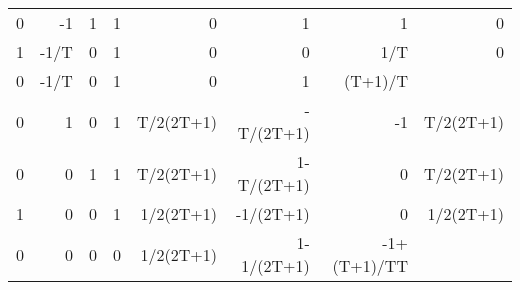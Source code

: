 \begin{table}[ht]
\begin{tabular}{rrrlrrrr}
        0      & -1         & 1  & 1 & 0         & 1          & 1           & 0         \\
        1      & -1/T       & 0  & 1 & 0         & 0          & 1/T         & 0         \\
        0      & -1/T       & 0  & 1 & 0         & 1          & (T+1)/T     &           \\ \hline
        0      & 1          & 0  & 1 & T/2(2T+1) & -T/(2T+1)  & -1          & T/2(2T+1) \\ \hline
        0      & 0          & 1  & 1 & T/2(2T+1) & 1-T/(2T+1) & 0           & T/2(2T+1) \\
        1      & 0          & 0  & 1 & 1/2(2T+1) & -1/(2T+1)  & 0           & 1/2(2T+1) \\ \hline
        0      & 0          & 0  & 0                      & 1/2(2T+1) & 1-1/(2T+1) & -1+(T+1)/TT &           \\ \hline
        \end{tabular}
        \end{table}



